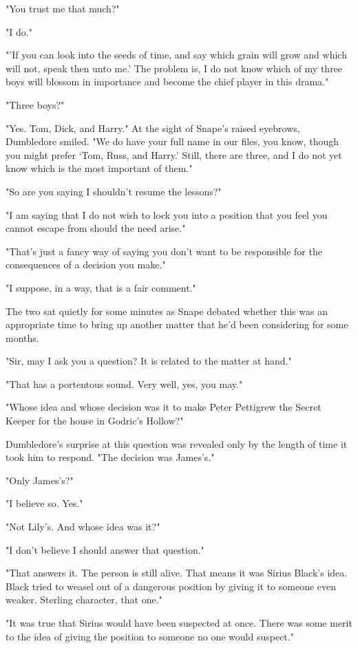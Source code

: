 \documentclass[a4paper,11pt]{article}
\begin{document}
"You trust me that much?"

"I do."

"'If you can look into the seeds of time, and say which grain will grow and which will not, speak then unto me.' The problem is, I do not know which of my three boys will blossom in importance and become the chief player in this drama."

"Three boys?"

"Yes. Tom, Dick, and Harry." At the sight of Snape's raised eyebrows, Dumbledore smiled. "We do have your full name in our files, you know, though you might prefer `Tom, Russ, and Harry.' Still, there are three, and I do not yet know which is the most important of them."

"So are you saying I shouldn't resume the lessons?"

"I am saying that I do not wish to lock you into a position that you feel you cannot escape from should the need arise."

"That's just a fancy way of saying you don't want to be responsible for the consequences of a decision you make."

"I suppose, in a way, that is a fair comment."

The two sat quietly for some minutes as Snape debated whether this was an appropriate time to bring up another matter that he'd been considering for some months.

"Sir, may I ask you a question? It is related to the matter at hand."

"That has a portentous sound. Very well, yes, you may."

"Whose idea and whose decision was it to make Peter Pettigrew the Secret Keeper for the house in Godric's Hollow?"

Dumbledore's surprise at this question was revealed only by the length of time it took him to respond. "The decision was James's."

"Only James's?"

"I believe so. Yes."

"Not Lily's. And whose idea was it?"

"I don't believe I should answer that question."

"That answers it. The person is still alive. That means it was Sirius Black's idea. Black tried to weasel out of a dangerous position by giving it to someone even weaker. Sterling character, that one."

"It was true that Sirius would have been suspected at once. There was some merit to the idea of giving the position to someone no one would suspect."
\end{document}
